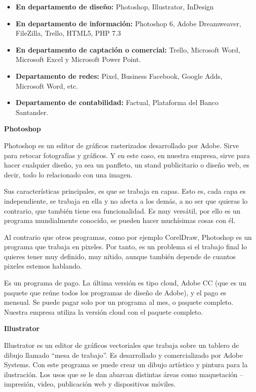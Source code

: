 \documentclass{article}
\begin{document}
\begin{itemize}
\item \textbf{En departamento de diseño:} Photoshop, Illustrator, InDesign 
\item \textbf{En departamento de información:} Photoshop 6, Adobe Dreamweaver, FileZilla, Trello, HTML5, PHP 7.3 
\item \textbf{En departamento de captación o comercial:} Trello, Microsoft Word, Microsoft Excel y Microsoft Power Point.
\item \textbf{Departamento de redes:} Pixel, Business Facebook, Google Adds, Microsoft Word, etc. 
\item \textbf{Departamento de contabilidad:} Factual, Plataforma del Banco Santander. 
\end{itemize}

\vspace{5mm}

\textbf{Photoshop}

Photoshop es un editor de gráficos rasterizados desarrollado por Adobe. Sirve para retocar fotografías y gráficos. Y en este caso, en nuestra empresa, sirve para hacer cualquier diseño, ya sea un panfleto, un stand publicitario o diseño web, es decir, todo lo relacionado con una imagen.  

Sus características principales, es que se trabaja en capas. Esto es, cada capa es independiente, se trabaja en ella y no afecta a los demás, a no ser que quieras lo contrario, que también tiene esa funcionalidad. Es muy versátil, por ello es un programa mundialmente conocido, se pueden hacer muchísimas cosas con él. 

Al contrario que otros programas, como por ejemplo CorelDraw, Photoshop es un programa que trabaja en pixeles. Por tanto, es un problema si el trabajo final lo quieres tener muy definido, muy nítido, aunque también depende de cuantos pixeles estemos hablando.  

Es un programa de pago. La última versión es tipo cloud, Adobe CC (que es un paquete que reúne todos los programas de diseño de Adobe), y el pago es mensual. Se puede pagar solo por un programa al mes, o paquete completo.  Nuestra empresa utiliza la versión cloud con el paquete completo. 

\vspace{5mm}

\textbf{Illustrator}

Illustrator es un editor de gráficos vectoriales que trabaja sobre un tablero de dibujo llamado “mesa de trabajo”. Es desarrollado y comercializado por Adobe Systems. Con este programa se puede crear un dibujo artístico y pintura para la ilustración. Los usos que se le dan abarcan distintas áreas como maquetación – impresión, video, publicación web y dispositivos móviles.  
\end{document}
